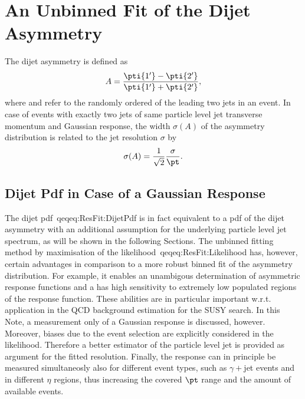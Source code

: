 \section{An Unbinned Fit of the Dijet Asymmetry}

The dijet asymmetry is defined as
\begin{equation}\label{eq:ResFit:Asymmetry}
  A = \frac{\pti{1'}-\pti{2'}}{\pti{1'}+\pti{2'}},
\end{equation}
where  and  refer to the randomly ordered \pt of the
leading two jets in an event.
In case of events with exactly two jets of same particle level jet
transverse momentum \pt and Gaussian response, the width $\sigma(A)$ of the asymmetry distribution is
related to the jet \pt resolution $\sigma$ by
\begin{equation*}
  \sigma(A) = \frac{1}{\sqrt{2}}\frac{\sigma}{\pt}.
\end{equation*}


\subsection{Dijet Pdf in Case of a Gaussian Response}

The dijet pdf~qeq{eq:ResFit:DijetPdf} is in fact equivalent to a pdf of the dijet
asymmetry with an additional assumption for the underlying particle
level jet spectrum, as will be shown in the following Sections.
The unbinned fitting method by maximisation of the
likelihood~qeq{eq:ResFit:Likelihood} has, however, certain advantages in
comparison to a more robust binned fit of the asymmetry
distribution.
For example, it enables an unambigous
determination of asymmetric response functions and a has high sensitivity to
extremely low populated regions of the response function.
These abilities are in particular important w.r.t. application in
the QCD background estimation for the SUSY search.
In this Note, a measurement only of a Gaussian response is discussed,
however.
Moreover, biases due to the event selection are explicitly considered
in the likelihood.
Therefore a better estimator of the particle level jet \pt is provided
as argument for the fitted resolution.
Finally, the response can in principle be measured simultaneosly
also for different event types, such as $\gamma+$jet events and in different
$\eta$ regions, thus increasing the covered $\pt$ range and the amount
of available events.

